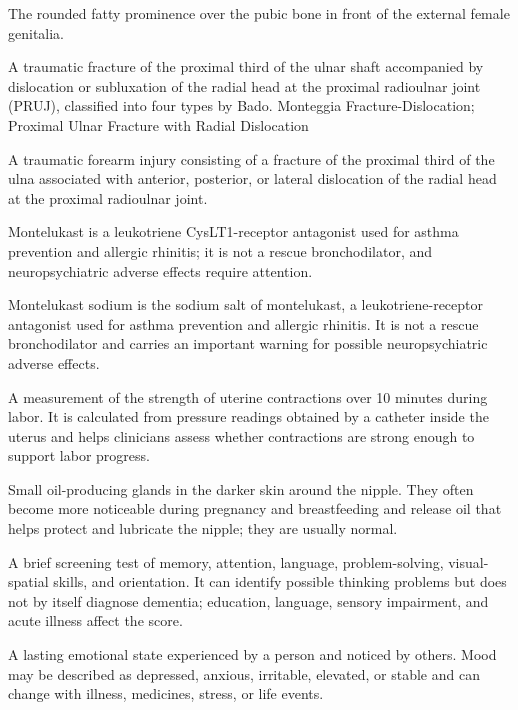  The rounded fatty prominence over the pubic bone in front of the external female genitalia.

 A traumatic fracture of the proximal third of the ulnar shaft accompanied by dislocation or subluxation of the radial head at the proximal radioulnar joint (PRUJ), classified into four types by Bado.
\synonyms
Monteggia Fracture-Dislocation; Proximal Ulnar Fracture with Radial Dislocation

 A traumatic forearm injury consisting of a fracture of the proximal third of the ulna associated with anterior, posterior, or lateral dislocation of the radial head at the proximal radioulnar joint.

 Montelukast is a leukotriene CysLT1-receptor antagonist used for asthma prevention and allergic rhinitis; it is not a rescue bronchodilator, and neuropsychiatric adverse effects require attention.

 Montelukast sodium is the sodium salt of montelukast, a leukotriene-receptor antagonist used for asthma prevention and allergic rhinitis. It is not a rescue bronchodilator and carries an important warning for possible neuropsychiatric adverse effects.

 A measurement of the strength of uterine contractions over 10 minutes during labor. It is calculated from pressure readings obtained by a catheter inside the uterus and helps clinicians assess whether contractions are strong enough to support labor progress.

 Small oil-producing glands in the darker skin around the nipple. They often become more noticeable during pregnancy and breastfeeding and release oil that helps protect and lubricate the nipple; they are usually normal.

 A brief screening test of memory, attention, language, problem-solving, visual-spatial skills, and orientation. It can identify possible thinking problems but does not by itself diagnose dementia; education, language, sensory impairment, and acute illness affect the score.

 A lasting emotional state experienced by a person and noticed by others. Mood may be described as depressed, anxious, irritable, elevated, or stable and can change with illness, medicines, stress, or life events.

